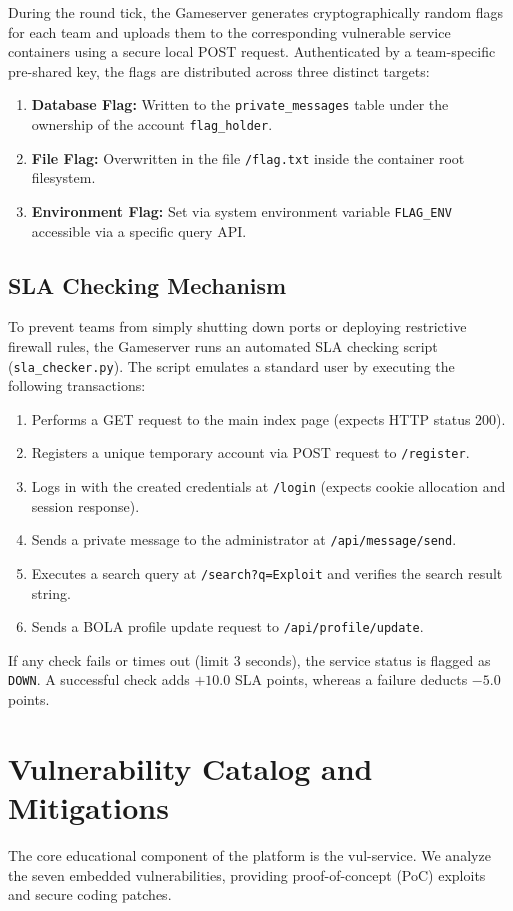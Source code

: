 \documentclass[10pt,journal,compsoc]{article}
\begin{document}
During the round tick, the Gameserver generates cryptographically random flags for each team and uploads them to the corresponding vulnerable service containers using a secure local POST request. Authenticated by a team-specific pre-shared key, the flags are distributed across three distinct targets:
\begin{enumerate}
    \item \textbf{Database Flag:} Written to the \texttt{private\_messages} table under the ownership of the account \texttt{flag\_holder}.
    \item \textbf{File Flag:} Overwritten in the file \texttt{/flag.txt} inside the container root filesystem.
    \item \textbf{Environment Flag:} Set via system environment variable \texttt{FLAG\_ENV} accessible via a specific query API.
\end{enumerate}

\subsection{SLA Checking Mechanism}
To prevent teams from simply shutting down ports or deploying restrictive firewall rules, the Gameserver runs an automated SLA checking script (\texttt{sla\_checker.py}). The script emulates a standard user by executing the following transactions:
\begin{enumerate}
    \item Performs a GET request to the main index page (expects HTTP status 200).
    \item Registers a unique temporary account via POST request to \texttt{/register}.
    \item Logs in with the created credentials at \texttt{/login} (expects cookie allocation and session response).
    \item Sends a private message to the administrator at \texttt{/api/message/send}.
    \item Executes a search query at \texttt{/search?q=Exploit} and verifies the search result string.
    \item Sends a BOLA profile update request to \texttt{/api/profile/update}.
\end{enumerate}
If any check fails or times out (limit 3 seconds), the service status is flagged as \texttt{DOWN}. A successful check adds $+10.0$ SLA points, whereas a failure deducts $-5.0$ points.

\section{Vulnerability Catalog and Mitigations}
The core educational component of the platform is the vul-service. We analyze the seven embedded vulnerabilities, providing proof-of-concept (PoC) exploits and secure coding patches.
\end{document}
